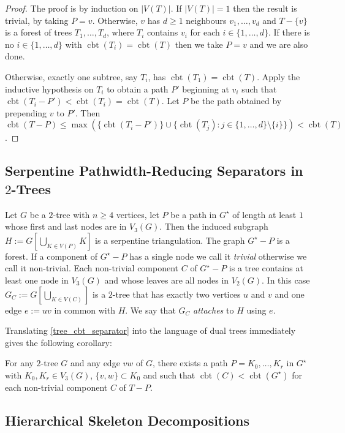 \documentclass[kpfonts]{patmorin}
\DeclareMathOperator{\cbt}{cbt}
\begin{document}
\begin{proof}
    The proof is by induction on $|V(T)|$.  If $|V(T)|=1$ then the result is trivial, by taking $P=v$.  Otherwise, $v$ has $d\ge 1$ neighbours $v_1,\ldots,v_d$ and $T-\{v\}$ is a forest of trees $T_1,\ldots,T_d$, where $T_i$ contains $v_i$ for each $i\in\{1,\ldots,d\}$.  If there is no $i\in\{1,\ldots,d\}$ with $\cbt(T_i)=\cbt(T)$ then we take $P=v$ and we are also done.

    Otherwise, exactly one subtree, say $T_i$, has $\cbt(T_1)=\cbt(T)$.  Apply the inductive hypothesis on $T_i$ to obtain a path $P'$ beginning at $v_i$ such that $\cbt(T_i-P')<\cbt(T_i)=\cbt(T)$.  Let $P$ be the path obtained by prepending $v$ to $P'$.  Then $\cbt(T-P)\le \max( \{\cbt(T_i-P')\}\cup\{\cbt(T_j):j\in\{1,\ldots,d\}\setminus\{i\}\})<\cbt(T)$.
\end{proof}




\subsection{Serpentine Pathwidth-Reducing Separators in $2$-Trees}

Let $G$ be a $2$-tree with $n\ge 4$ vertices, let $P$ be a path in $G^\star$ of length at least $1$ whose first and last nodes are in $V_3(G)$.  Then the induced subgraph $H:=G[\bigcup_{K\in V(P)} K]$ is a serpentine triangulation.
The graph $G^\star-P$ is a forest.  If a component of $G^\star-P$ has a single node we call it \emph{trivial} otherwise we call it non-trivial. Each non-trivial component $C$ of $G^\star-P$ is a tree contains at least one node in $V_3(G)$ and whose leaves are all nodes in $V_2(G)$. In this case $G_C:=G[\bigcup_{K\in V(C)}]$ is a $2$-tree that has exactly two vertices $u$ and $v$ and one edge $e:=uv$ in common with $H$.  We say that $G_C$ \emph{attaches} to $H$ using $e$.

Translating \cref{tree_cbt_separator} into the language of dual trees immediately gives the following corollary:

\begin{lem}\label{serpentine_separator}
    For any $2$-tree $G$ and any edge $vw$ of $G$, there exists a path $P=K_0,\ldots,K_r$ in $G^\star$ with $K_0,K_r\in V_3(G)$, $\{v,w\}\subset K_0$ and such that $\cbt(C)<\cbt(G^{\star})$ for each non-trivial component $C$ of $T-P$.
\end{lem}

\subsection{Hierarchical Skeleton Decompositions}
\end{document}
